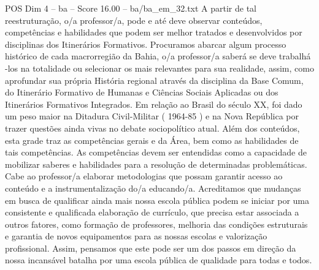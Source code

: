 \begin{textsample}{POS Dim 4 – ba – Score 16.00 – ba/ba\_em\_32.txt}
A partir de tal reestruturação, o/a professor/a, pode e até deve observar conteúdos, competências e habilidades que podem ser melhor tratados e desenvolvidos por disciplinas dos Itinerários Formativos.
Procuramos abarcar algum processo histórico de cada macrorregião da Bahia, o/a professor/a saberá se deve trabalhá -los na totalidade ou selecionar os mais relevantes para sua realidade, assim, como aprofundar sua própria História regional através da disciplina da Base Comum, do Itinerário Formativo de Humanas e Ciências Sociais Aplicadas ou dos Itinerários Formativos Integrados.
Em relação ao Brasil do século XX, foi dado um peso maior na Ditadura Civil-Militar ( 1964-85 ) e na Nova República por trazer questões ainda vivas no debate sociopolítico atual.
Além dos conteúdos, esta grade traz as competências gerais e da Área, bem como as habilidades de tais competências.
As competências devem ser entendidas como a capacidade de mobilizar saberes e habilidades para a resolução de determinadas problemáticas.
Cabe ao professor/a elaborar metodologias que possam garantir acesso ao conteúdo e a instrumentalização do/a educando/a.
Acreditamos que mudanças em busca de qualificar ainda mais nossa escola pública podem se iniciar por uma consistente e qualificada elaboração de currículo, que precisa estar associada a outros fatores, como formação de professores, melhoria das condições estruturais e garantia de novos equipamentos para as nossas escolas e valorização profissional.
Assim, pensamos que este pode ser um dos passos em direção da nossa incansável batalha por uma escola pública de qualidade para todas e todos.

\end{textsample}
